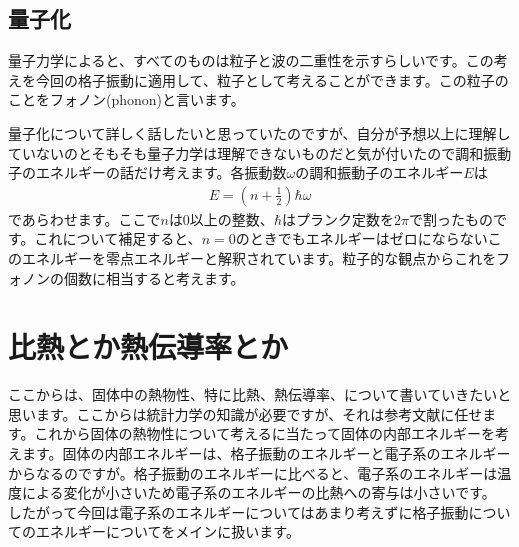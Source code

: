 \documentclass[10pt,b5paper,papersize,dvipdfmx]{jsbook}
\begin{document}
\subsection{量子化}
量子力学によると、すべてのものは粒子と波の二重性を示すらしいです。この考えを今回の格子振動に適用して、粒子として考えることができます。この粒子のことをフォノン(phonon)と言います。\par
量子化について詳しく話したいと思っていたのですが、自分が予想以上に理解していないのとそもそも量子力学は理解できないものだと気が付いたので調和振動子のエネルギーの話だけ考えます。各振動数$\omega$の調和振動子のエネルギー$E$は
\begin{align}
  E = \left(n + \frac{1}{2}\right)\hbar \omega
\end{align}
であらわせます。ここで$n$は0以上の整数、$\hbar$はプランク定数を$2\pi$で割ったものです。これについて補足すると、$n = 0$のときでもエネルギーはゼロにならないこのエネルギーを零点エネルギーと解釈されています。粒子的な観点からこれをフォノンの個数に相当すると考えます。







\section{比熱とか熱伝導率とか}
ここからは、固体中の熱物性、特に比熱、熱伝導率、について書いていきたいと思います。ここからは統計力学の知識が必要ですが、それは参考文献に任せます。これから固体の熱物性について考えるに当たって固体の内部エネルギーを考えます。固体の内部エネルギーは、格子振動のエネルギーと電子系のエネルギーからなるのですが。格子振動のエネルギーに比べると、電子系のエネルギーは温度による変化が小さいため電子系のエネルギーの比熱への寄与は小さいです。
したがって今回は電子系のエネルギーについてはあまり考えずに格子振動についてのエネルギーについてをメインに扱います。
\end{document}
